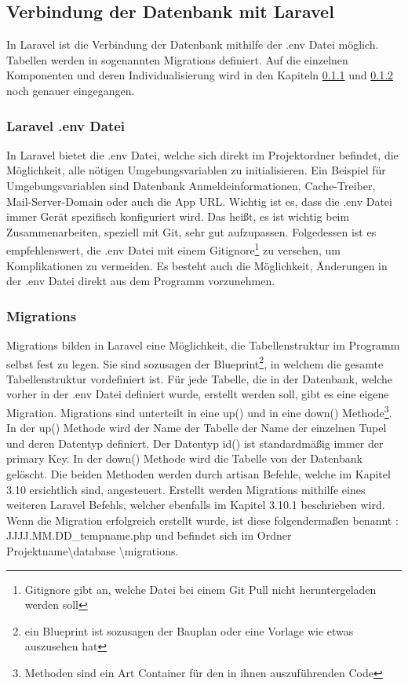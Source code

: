 \newpage
\subsection{Verbindung der Datenbank mit Laravel}
In Laravel ist die Verbindung  der Datenbank mithilfe der .env Datei möglich. Tabellen werden in sogenannten Migrations definiert. Auf die einzelnen Komponenten und deren Individualisierung wird in den Kapiteln \ref{sec:Laravel .env Datei} und \ref{sec:Migrations} noch genauer eingegangen.
\subsubsection{Laravel .env Datei } \label{sec:Laravel .env Datei}
In Laravel bietet die .env Datei, welche sich direkt im Projektordner befindet, die Möglichkeit, alle nötigen Umgebungsvariablen zu initialisieren. Ein Beispiel für Umgebungsvariablen sind Datenbank Anmeldeinformationen, Cache-Treiber, Mail-Server-Domain oder auch die App URL. Wichtig ist es, dass die .env Datei immer Gerät spezifisch konfiguriert wird. Das heißt, es ist wichtig beim Zusammenarbeiten, speziell mit Git, sehr gut aufzupassen. Folgedessen ist es empfehlenswert, die .env Datei  mit einem Gitignore\footnote{Gitignore gibt an, welche Datei bei einem Git Pull nicht heruntergeladen werden soll} zu versehen, um Komplikationen zu vermeiden. Es besteht auch die Möglichkeit,  Änderungen in der .env Datei direkt aus dem Programm vorzunehmen. 

\subsubsection{Migrations}\label{sec:Migrations}
Migrations bilden in Laravel eine Möglichkeit, die Tabellenstruktur im Programm selbst fest zu legen. Sie sind sozusagen der Blueprint\footnote{ein Blueprint ist sozusagen der Bauplan oder eine Vorlage wie etwas auszusehen hat}, in welchem die gesamte Tabellenstruktur vordefiniert ist. Für jede Tabelle, die in der Datenbank, welche vorher in der  .env Datei  definiert wurde, erstellt werden soll, gibt es eine eigene Migration. Migrations sind unterteilt in eine up() und in eine down()  Methode\footnote{Methoden sind ein Art Container für den in ihnen auszuführenden Code}. In der up() Methode wird der Name der Tabelle der Name der einzelnen Tupel und deren Datentyp definiert. Der Datentyp id() ist standardmäßig immer der primary Key. 
In der down() Methode wird die Tabelle von der Datenbank gelöscht. Die beiden Methoden werden durch artisan Befehle, welche im Kapitel 3.10 ersichtlich sind, angesteuert. 
Erstellt werden Migrations mithilfe eines weiteren Laravel Befehls, welcher ebenfalls  im Kapitel 3.10.1 beschrieben wird. Wenn die Migration erfolgreich erstellt wurde, ist diese folgendermaßen benannt : JJJJ.MM.DD\_tempname.php und befindet sich im Ordner Projektname\textbackslash database \textbackslash migrations.


